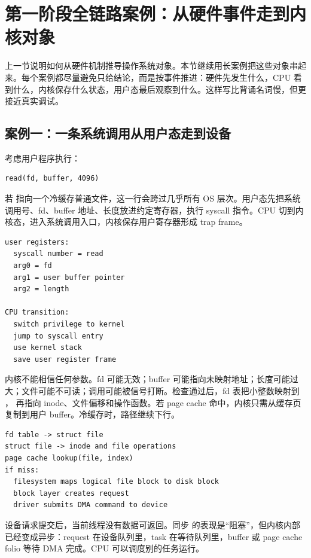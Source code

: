 \section{第一阶段全链路案例：从硬件事件走到内核对象}

上一节说明如何从硬件机制推导操作系统对象。本节继续用长案例把这些对象串起来。每个案例都尽量避免只给结论，而是按事件推进：硬件先发生什么，CPU 看到什么，内核保存什么状态，用户态最后观察到什么。这样写比背诵名词慢，但更接近真实调试。

\subsection{案例一：一条系统调用从用户态走到设备}

考虑用户程序执行：

\begin{lstlisting}
read(fd, buffer, 4096)
\end{lstlisting}

若  指向一个冷缓存普通文件，这一行会跨过几乎所有 OS 层次。用户态先把系统调用号、fd、buffer 地址、长度放进约定寄存器，执行 syscall 指令。CPU 切到内核态，进入系统调用入口，内核保存用户寄存器形成 trap frame。

\begin{lstlisting}
user registers:
  syscall number = read
  arg0 = fd
  arg1 = user buffer pointer
  arg2 = length

CPU transition:
  switch privilege to kernel
  jump to syscall entry
  use kernel stack
  save user register frame
\end{lstlisting}

内核不能相信任何参数。fd 可能无效；buffer 可能指向未映射地址；长度可能过大；文件可能不可读；调用可能被信号打断。检查通过后，fd 表把小整数映射到 ， 再指向 inode、文件偏移和操作函数。若 page cache 命中，内核只需从缓存页复制到用户 buffer。冷缓存时，路径继续下行。

\begin{lstlisting}
fd table -> struct file
struct file -> inode and file operations
page cache lookup(file, index)
if miss:
  filesystem maps logical file block to disk block
  block layer creates request
  driver submits DMA command to device
\end{lstlisting}

设备请求提交后，当前线程没有数据可返回。同步  的表现是“阻塞”，但内核内部已经变成异步：request 在设备队列里，task 在等待队列里，buffer 或 page cache folio 等待 DMA 完成。CPU 可以调度别的任务运行。

